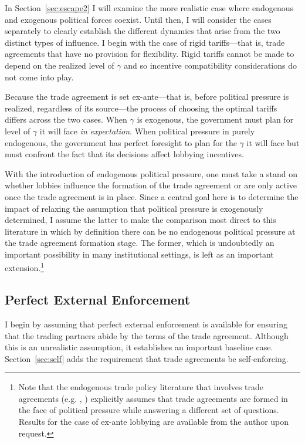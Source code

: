 \documentclass[12pt]{article}
\newcommand{\ga}{\gamma}
\begin{document}
In Section~\ref{sec:escape2} I will examine the more realistic case where endogenous and exogenous political forces coexist. Until then, I will consider the cases separately to clearly establish the different dynamics that arise from the two distinct types of influence. I begin with the case of rigid tariffs---that is, trade agreements that have no provision for flexibility. Rigid tariffs cannot be made to depend on the realized level of $\ga$ and so incentive compatibility considerations do not come into play.

Because the trade agreement is set ex-ante---that is, before political pressure is realized, regardless of its source---the process of choosing the optimal tariffs differs across the two cases. When $\ga$ is exogenous, the government must plan for level of $\ga$ it will face \textit{in expectation}. When political pressure in purely endogenous, the government has perfect foresight to plan for the $\ga$ it will face but must confront the fact that its decisions affect lobbying incentives.

With the introduction of endogenous political pressure, one must take a stand on whether lobbies influence the formation of the trade agreement or are only active once the trade agreement is in place. Since a central goal here is to determine the impact of relaxing the assumption that political pressure is exogenously determined, I assume the latter to make the comparison most direct to this literature in which by definition there can be no endogenous political pressure at the trade agreement formation stage. The former, which is undoubtedly an important possibility in many institutional settings, is left as an important extension.\footnote{Note that the endogenous trade policy literature that involves trade agreements (e.g. \Textcite{gh95}, \Textcite{mrc2007}) explicitly assumes that trade agreements are formed in the face of political pressure while answering a different set of questions. Results for the case of ex-ante lobbying are available from the author upon request.}


\subsection{Perfect External Enforcement}
\label{sec:perfect}
I begin by assuming that perfect external enforcement is available for ensuring that the trading partners abide by the terms of the trade agreement. Although this is an unrealistic assumption, it establishes an important baseline case. Section~\ref{sec:self} adds the requirement that trade agreements be self-enforcing.
\end{document}
